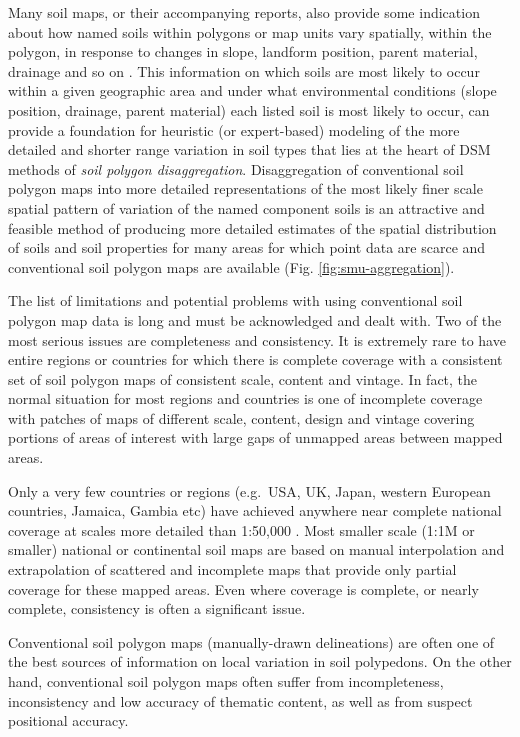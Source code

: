 \documentclass[11pt]{krantz}
\makeatletter
\newenvironment{kframe}{%
\medskip{}
\setlength{\fboxsep}{.8em}
 \def\at@end@of@kframe{}%
 \ifinner\ifhmode%
  \def\at@end@of@kframe{\end{minipage}}%
  \begin{minipage}{\columnwidth}%
 \fi\fi%
 \def\FrameCommand##1{\hskip\@totalleftmargin \hskip-\fboxsep
 \colorbox{shadecolor}{##1}\hskip-\fboxsep
     \hskip-\linewidth \hskip-\@totalleftmargin \hskip\columnwidth}%
 \MakeFramed {\advance\hsize-\width
   \@totalleftmargin\z@ \linewidth\hsize
   \@setminipage}}%
 {\par\unskip\endMakeFramed%
 \at@end@of@kframe}
\newenvironment{rmdblock}[1]
  {
  \begin{itemize}
  \renewcommand{\labelitemi}{
    \raisebox{-.7\height}[0pt][0pt]{
      {\setkeys{Gin}{width=3em,keepaspectratio}\texttt{[image: images/\#1]}}
    }
  }
  \setlength{\fboxsep}{1em}
  \begin{kframe}
  \item
  }
  {
  \end{kframe}
  \end{itemize}
  }
\newenvironment{rmdnote}
  {\begin{rmdblock}{note}}
  {\end{rmdblock}}
\theoremstyle{definition}
\theoremstyle{definition}
\theoremstyle{definition}
\theoremstyle{remark}
\makeatother
\begin{document}
Many soil maps, or their accompanying reports, also provide some
indication about how named soils within polygons or map units vary
spatially, within the polygon, in response to changes in slope, landform
position, parent material, drainage and so on
\citep{SSDS1993, Wysocki2005Geoderma}. This information on which soils
are most likely to occur within a given geographic area and under what
environmental conditions (slope position, drainage, parent material)
each listed soil is most likely to occur, can provide a foundation for
heuristic (or expert-based) modeling of the more detailed and shorter
range variation in soil types that lies at the heart of DSM methods of
\emph{soil polygon disaggregation}. Disaggregation of conventional soil
polygon maps into more detailed representations of the most likely finer
scale spatial pattern of variation of the named component soils is an
attractive and feasible method of producing more detailed estimates of
the spatial distribution of soils and soil properties for many areas for
which point data are scarce and conventional soil polygon maps are
available (Fig. \ref{fig:smu-aggregation}).

The list of limitations and potential problems with using conventional
soil polygon map data is long and must be acknowledged and dealt with.
Two of the most serious issues are completeness and consistency. It is
extremely rare to have entire regions or countries for which there is
complete coverage with a consistent set of soil polygon maps of
consistent scale, content and vintage. In fact, the normal situation for
most regions and countries is one of incomplete coverage with patches of
maps of different scale, content, design and vintage covering portions
of areas of interest with large gaps of unmapped areas between mapped
areas.

Only a very few countries or regions (e.g.~USA, UK, Japan, western
European countries, Jamaica, Gambia etc) have achieved anywhere near
complete national coverage at scales more detailed than 1:50,000
\citep{Rossiter2004SUM, Hartemink2008SMD}. Most smaller scale (1:1M or
smaller) national or continental soil maps are based on manual
interpolation and extrapolation of scattered and incomplete maps that
provide only partial coverage for these mapped areas. Even where
coverage is complete, or nearly complete, consistency is often a
significant issue.

\begin{rmdnote}
Conventional soil polygon maps (manually-drawn delineations) are often
one of the best sources of information on local variation in soil
polypedons. On the other hand, conventional soil polygon maps often
suffer from incompleteness, inconsistency and low accuracy of thematic
content, as well as from suspect positional accuracy.
\end{rmdnote}
\end{document}
